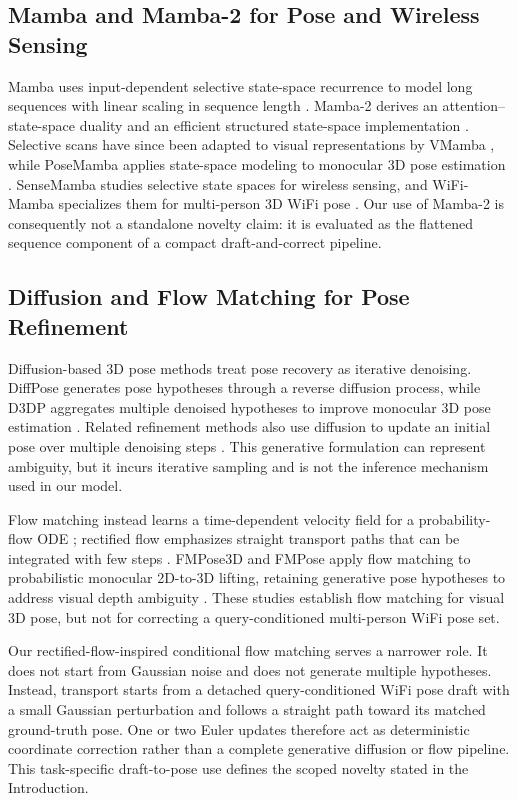 \documentclass[conference,onecolumn]{IEEEtran}
\begin{document}
\subsection{Mamba and Mamba-2 for Pose and Wireless Sensing}
Mamba uses input-dependent selective state-space recurrence to model long sequences with linear scaling in sequence length \cite{gu2023mamba}. Mamba-2 derives an attention--state-space duality and an efficient structured state-space implementation \cite{dao2024mamba2}. Selective scans have since been adapted to visual representations by VMamba \cite{liu2024vmamba}, while PoseMamba applies state-space modeling to monocular 3D pose estimation \cite{huang2025posemamba}. SenseMamba studies selective state spaces for wireless sensing, and WiFi-Mamba specializes them for multi-person 3D WiFi pose \cite{huang2025sensemamba,nguyen2026wifimamba}. Our use of Mamba-2 is consequently not a standalone novelty claim: it is evaluated as the flattened sequence component of a compact draft-and-correct pipeline.

\subsection{Diffusion and Flow Matching for Pose Refinement}
Diffusion-based 3D pose methods treat pose recovery as iterative denoising. DiffPose generates pose hypotheses through a reverse diffusion process, while D3DP aggregates multiple denoised hypotheses to improve monocular 3D pose estimation \cite{gong2023diffpose,shan2023d3dp}. Related refinement methods also use diffusion to update an initial pose over multiple denoising steps \cite{kang2024diffusionrefine}. This generative formulation can represent ambiguity, but it incurs iterative sampling and is not the inference mechanism used in our model.

Flow matching instead learns a time-dependent velocity field for a probability-flow ODE \cite{lipman2023flowmatching}; rectified flow emphasizes straight transport paths that can be integrated with few steps \cite{liu2023rectifiedflow}. FMPose3D and FMPose apply flow matching to probabilistic monocular 2D-to-3D lifting, retaining generative pose hypotheses to address visual depth ambiguity \cite{wang2026fmpose3d,le2026fmpose}. These studies establish flow matching for visual 3D pose, but not for correcting a query-conditioned multi-person WiFi pose set.

Our rectified-flow-inspired conditional flow matching serves a narrower role. It does not start from Gaussian noise and does not generate multiple hypotheses. Instead, transport starts from a detached query-conditioned WiFi pose draft with a small Gaussian perturbation and follows a straight path toward its matched ground-truth pose. One or two Euler updates therefore act as deterministic coordinate correction rather than a complete generative diffusion or flow pipeline. This task-specific draft-to-pose use defines the scoped novelty stated in the Introduction.
\end{document}
